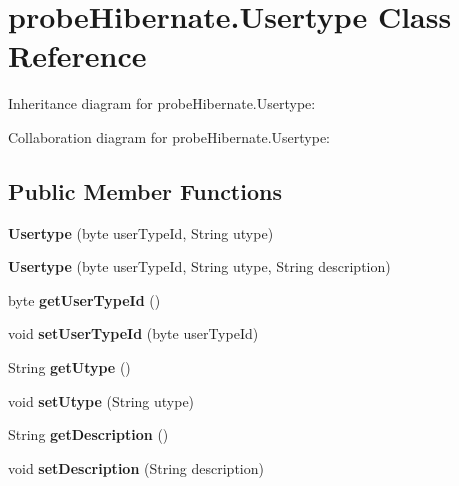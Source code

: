 \hypertarget{classprobe_hibernate_1_1_usertype}{}\section{probe\+Hibernate.\+Usertype Class Reference}
\label{classprobe_hibernate_1_1_usertype}


Inheritance diagram for probe\+Hibernate.\+Usertype\+:


Collaboration diagram for probe\+Hibernate.\+Usertype\+:
\subsection*{Public Member Functions}
\begin{DoxyCompactItemize}
\item 
\mbox{\label{classprobe_hibernate_1_1_usertype_ae3e23e028f35e37996480f134ed5f3aa}} 
{\bfseries Usertype} (byte user\+Type\+Id, String utype)
\item 
\mbox{\label{classprobe_hibernate_1_1_usertype_a812aff69beba0dbf694e10caa74584ae}} 
{\bfseries Usertype} (byte user\+Type\+Id, String utype, String description)
\item 
\mbox{\label{classprobe_hibernate_1_1_usertype_ab2de99b8f0b0be07916dbc05bebe037f}} 
byte {\bfseries get\+User\+Type\+Id} ()
\item 
\mbox{\label{classprobe_hibernate_1_1_usertype_a944ed0d98e6e176517a1f94a5e4b918f}} 
void {\bfseries set\+User\+Type\+Id} (byte user\+Type\+Id)
\item 
\mbox{\label{classprobe_hibernate_1_1_usertype_aa4810c1f490c1b21bc0ad7d5fd0c5614}} 
String {\bfseries get\+Utype} ()
\item 
\mbox{\label{classprobe_hibernate_1_1_usertype_a8a67a4634d36e7e53cc358259b9eb71c}} 
void {\bfseries set\+Utype} (String utype)
\item 
\mbox{\label{classprobe_hibernate_1_1_usertype_a5271e3171d1eeab44495f7a4931ac47e}} 
String {\bfseries get\+Description} ()
\item 
\mbox{\label{classprobe_hibernate_1_1_usertype_ac4f1ba81fe2ceef4d4b4a329d74d8ee3}} 
void {\bfseries set\+Description} (String description)
\end{DoxyCompactItemize}


